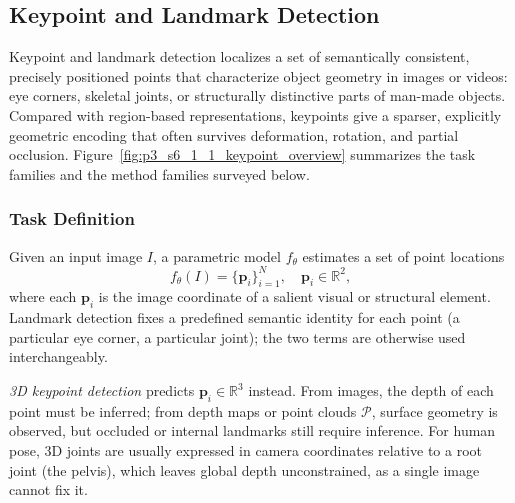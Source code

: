 

\subsection{Keypoint and Landmark Detection}
\label{sec:keypoint_landmark}
Keypoint and landmark detection localizes a set of semantically consistent, precisely positioned points that characterize object geometry in images or videos: eye corners, skeletal joints, or structurally distinctive parts of man-made objects.
Compared with region-based representations, keypoints give a sparser, explicitly geometric encoding that often survives deformation, rotation, and partial occlusion.
Figure~\ref{fig:p3_s6_1_1_keypoint_overview} summarizes the task families and the method families surveyed below.



\subsubsection{Task Definition}
Given an input image $I$, a parametric model $f_{\theta}$ estimates a set of point locations
\begin{equation}
f_{\theta}(I) = \{\mathbf{p}_i\}_{i=1}^{N}, \quad \mathbf{p}_i \in \mathbb{R}^2,
\end{equation}
where each $\mathbf{p}_i$ is the image coordinate of a salient visual or structural element. Landmark detection fixes a predefined semantic identity for each point (a particular eye corner, a particular joint); the two terms are otherwise used interchangeably.

\emph{3D keypoint detection} predicts $\mathbf{p}_i\in\mathbb{R}^{3}$ instead. From images, the depth of each point must be inferred; from depth maps or point clouds $\mathcal{P}$, surface geometry is observed, but occluded or internal landmarks still require inference. For human pose, 3D joints are usually expressed in camera coordinates relative to a root joint (the pelvis), which leaves global depth unconstrained, as a single image cannot fix it.

